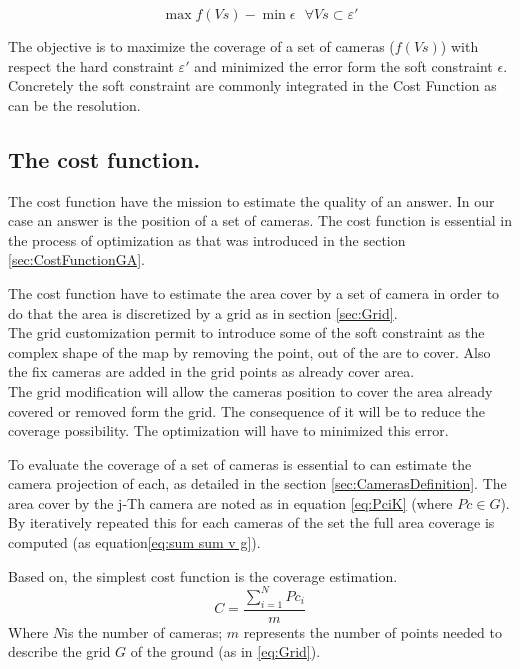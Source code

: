   \begin{equation}\label{eq:constraintEpsilon}
 	\max f(Vs) - \min \epsilon  \mbox{  } \forall Vs \subset \varepsilon'
 \end{equation}
 
The objective is to maximize the coverage of a set of cameras ($f(Vs)$) with respect the hard constraint $\varepsilon'$ and minimized the error form the soft constraint $\epsilon$.
Concretely the soft constraint are commonly integrated in the Cost Function as can be the resolution. 


\subsection{The cost function.}

The cost function have the mission to estimate the quality of an answer. In our case an answer is the position  of a set of cameras. The cost function is essential in the process of optimization as that was introduced in the section \ref{sec:CostFunctionGA}.

The cost function have to estimate the area cover by a set of camera in order to do that the area is discretized by a grid as in section \ref{sec:Grid}. \\
The grid customization permit to introduce some of the soft constraint as the complex shape of the map by removing the point, out of the are to cover. Also the fix cameras are added in the grid points as already cover area. \\
The grid modification will allow the cameras position to cover the area already covered or removed form the grid. The consequence of it will be to reduce the coverage possibility. The optimization will have to minimized this error.

To evaluate the coverage of a set of cameras is essential to can estimate the camera projection of each, as detailed in the section \ref{sec:CamerasDefinition}. The area cover by the j-Th camera are noted as in equation \ref{eq:PciK} (where $Pc\in G$). By iteratively repeated this for each cameras of the set the full area coverage is computed (as equation\ref{eq:sum sum v g}). 

Based on, the  simplest cost function is the coverage estimation.
\begin{equation}\label{eq:CostFBase}
C =  \frac{\sum_{i=1}^N{Pc_i} }{m}   
\end{equation}
Where $N $is the number of cameras; 
$m$ represents the number of points needed to describe the grid $G$ of the ground (as in \ref{eq:Grid}).\\

